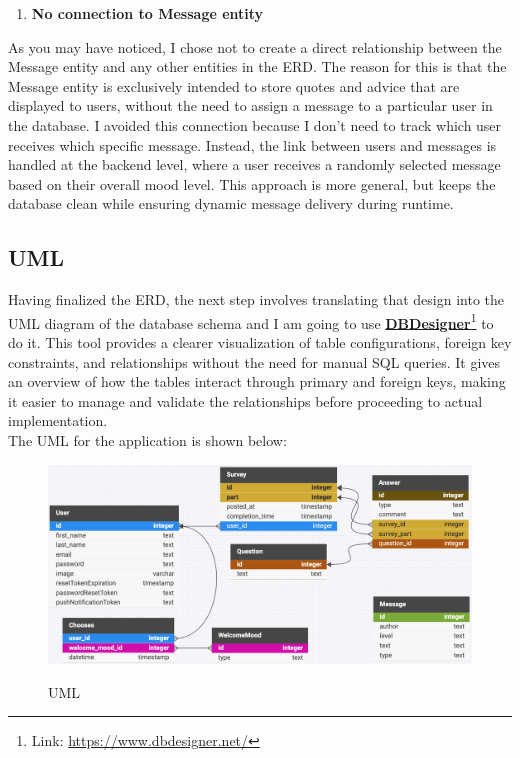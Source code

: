 \begin{enumerate}[resume]
    \item \textbf{No connection to Message entity}
\end{enumerate}

\noindent As you may have noticed, I chose not to create a direct relationship between the Message entity and any other entities in the ERD. The reason for this is that the Message entity is exclusively intended to store quotes and advice that are displayed to users, without the need to assign a message to a particular user in the database. I avoided this connection because I don't need to track which user receives which specific message. Instead, the link between users and messages is handled at the backend level, where a user receives a randomly selected message based on their overall mood level. This approach is more general, but keeps the database clean while ensuring dynamic message delivery during runtime.

\subsection{UML}

Having finalized the ERD, the next step involves translating that design into the UML diagram of the database schema and I am going to use \textbf{\href{https://www.dbdesigner.net/}{DBDesigner}}\footnote{Link: \url{https://www.dbdesigner.net/}} to do it. This tool provides a clearer visualization of table configurations, foreign key constraints, and relationships without the need for manual SQL queries. It gives an overview of how the tables interact through primary and foreign keys, making it easier to manage and validate the relationships before proceeding to actual implementation.\vspace{5mm} \\
The UML for the application is shown below:

\vspace{5mm}

\FloatBarrier
\begin{figure}[ht]
    \centering
    \includegraphics[width=\linewidth]{figures/database/UML.png}
    \label{fig:uml}
    \caption{UML}
\end{figure}
\FloatBarrier

